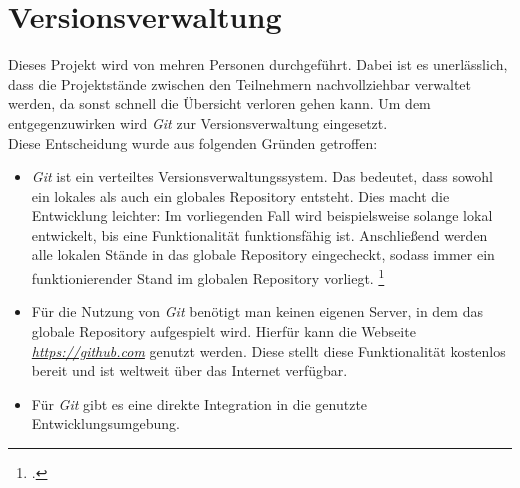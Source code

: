 \section{Versionsverwaltung}
\label{sec:versionsverwaltung}
Dieses Projekt wird von mehren Personen durchgeführt. Dabei ist es unerlässlich, dass die Projektstände zwischen den Teilnehmern nachvollziehbar verwaltet werden, da sonst schnell die Übersicht verloren gehen kann. Um dem entgegenzuwirken wird \textit{Git} zur Versionsverwaltung eingesetzt. \\
Diese Entscheidung wurde aus folgenden Gründen getroffen:
\begin{itemize}
\item \textit{Git} ist ein verteiltes Versionsverwaltungssystem. Das bedeutet, dass sowohl ein lokales als auch ein globales Repository entsteht. Dies macht die Entwicklung leichter: Im vorliegenden Fall wird beispielsweise solange lokal entwickelt, bis eine Funktionalität funktionsfähig ist. Anschließend werden alle lokalen Stände in das globale Repository eingecheckt, sodass immer ein funktionierender Stand im globalen Repository vorliegt. \footcite{online:definition-git}
\item Für die Nutzung von \textit{Git} benötigt man keinen eigenen Server, in dem das globale Repository aufgespielt wird. Hierfür kann die Webseite \href{https://github.com}{\textit{https://github.com}} genutzt werden. Diese stellt diese Funktionalität kostenlos bereit und ist weltweit über das Internet verfügbar. 
\item Für \textit{Git} gibt es eine direkte Integration in die genutzte Entwicklungsumgebung.
\end{itemize}